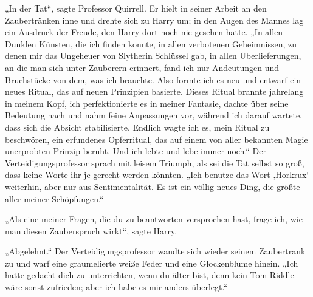 „In der Tat“, sagte Professor Quirrell.
Er hielt in seiner Arbeit an den Zaubertränken inne und drehte sich zu Harry um; in den Augen des Mannes lag ein Ausdruck der Freude, den Harry dort noch nie gesehen hatte. „In allen Dunklen Künsten, die ich finden konnte, in allen verbotenen Geheimnissen, zu denen mir das Ungeheuer von Slytherin Schlüssel gab, in allen Überlieferungen, an die man sich unter Zauberern erinnert, fand ich nur Andeutungen und Bruchstücke von dem, was ich brauchte. Also formte ich es neu und entwarf ein neues Ritual, das auf neuen Prinzipien basierte. Dieses Ritual brannte jahrelang in meinem Kopf, ich perfektionierte es in meiner Fantasie, dachte über seine Bedeutung nach und nahm feine Anpassungen vor, während ich darauf wartete, dass sich die Absicht stabilisierte. Endlich wagte ich es, mein Ritual zu beschwören, ein erfundenes Opferritual, das auf einem von aller bekannten Magie unerprobten Prinzip beruht. Und ich lebte und lebe immer noch.“
Der Verteidigungsprofessor sprach mit leisem Triumph, als sei die Tat selbst so groß, dass keine Worte ihr je gerecht werden könnten.
„Ich benutze das Wort ‚Horkrux‘ weiterhin, aber nur aus Sentimentalität. Es ist ein völlig neues Ding, die größte aller meiner Schöpfungen.“

„Als eine meiner Fragen, die du zu beantworten versprochen hast, frage ich, wie man diesen Zauberspruch wirkt“, sagte Harry.

„Abgelehnt.“
Der Verteidigungsprofessor wandte sich wieder seinem Zaubertrank zu und warf eine graumelierte weiße Feder und eine Glockenblume hinein.
„Ich hatte gedacht dich zu unterrichten, wenn du älter bist, denn kein Tom Riddle wäre sonst zufrieden; aber ich habe es mir anders überlegt.“

